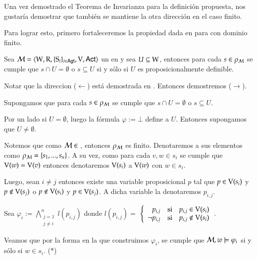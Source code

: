 Una vez demostrado el Teorema de Invarianza para la definición propuesta, nos gustaría demostrar que también se mantiene la otra dirección en
el caso finito. 

Para lograr esto, primero fortaleceremos la propiedad dada en  para \ultss con dominio finito. 

\begin{lema}\label{lema:finite-propositionally-definable-lemma}
    Sea $\mathcal{M}=\langle \mathrm{W},\mathrm{R},\{ \mathrm{S}_i \}_{i \in {\rm \sf Agt}},\mathrm{V},{\rm \sf Act} \rangle$ un \ults en \MFD y sea $U \subseteq \mathrm{W}$, entonces
    para cada $s \in \rho_{\mathcal{M}}$ se cumple que $s \cap U = \emptyset$ o $s \subseteq U$ si y sólo si $U$ es proposicionalmente definible.
\end{lema}

\begin{demostracion}
    Notar que la direccion ($\leftarrow$) está demostrada en . Entonces demostremos ($\rightarrow$).

    Supongamos que para cada $s \in \rho_{\mathcal{M}}$ se cumple que $s \cap U = \emptyset$ o $s \subseteq U$.

    Por un lado si $U = \emptyset$, luego la fórmula $ \varphi := \bot$ define a $U$. Entonces supongamos que $U \neq \emptyset$. 
    
    Notemos que como $\mathcal{M} \in$ \MFD, entonces $\rho_{\mathcal{M}}$ es finito. Denotaremos a sus elementos como $\rho_{\mathcal{M}} = \{s_1,...,s_n\}$. 
    A su vez, como para cada $v,w \in s_i$ se cumple que $\mathrm{V}(w) = \mathrm{V}(v)$ entonces denotaremos $\mathrm{V}(s_i)$ a $\mathrm{V}(w)$ con $w \in s_i$. 
    
    Luego, sean $i \neq j$ entonces existe una variable proposicional $p$ tal que $p \in \mathrm{V}(s_i)$ y $p \not\in \mathrm{V}(s_j)$ o $p \not\in \mathrm{V}(s_i)$ 
    y $p \in \mathrm{V}(s_j)$. A dicha variable la denotaremos $p_{i,j}$.



    Sea $\varphi_i := \bigwedge\limits_{\substack{j = 1 \\ j \neq i}}^{n} l(p_{i,j})$ donde $l(p_{i,j}) = $
    $\left\{ \begin{array}{rcl}
            p_{i,j} & \mbox{si}
            & p_{i,j} \in \mathrm{V}(s_i) \\ \neg p_{i,j} & \mbox{si} & p_{i,j} \notin \mathrm{V}(s_i) \\
            \end{array}\right. 
    $.

    Veamos que por la forma en la que construimos $\varphi_i$, se cumple que $\mathcal{M}, w \models \varphi_i$ si y sólo si $w \in s_i$. ($*$)
    

\end{demostracion}
